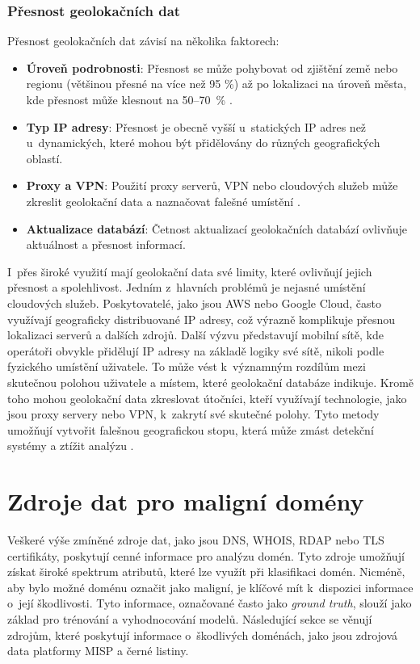 \subsubsection*{Přesnost geolokačních dat}
Přesnost geolokačních dat závisí na několika faktorech:
\begin{itemize}
    \item \textbf{Úroveň podrobnosti}: Přesnost se může pohybovat od zjištění země nebo regionu (většinou přesné na více než 95 \%) až po lokalizaci na úroveň města, kde přesnost může klesnout na 50--70~\% \cite{huang2017geolocation}.
    \item \textbf{Typ IP adresy}: Přesnost je obecně vyšší u~statických IP adres než u~dynamických, které mohou být přidělovány do různých geografických oblastí.
    \item \textbf{Proxy a VPN}: Použití proxy serverů, VPN nebo cloudových služeb může zkreslit geolokační data a naznačovat falešné umístění \cite{mcpherson2009vpn}.
    \item \textbf{Aktualizace databází}: Četnost aktualizací geolokačních databází ovlivňuje aktuálnost a přesnost informací.
\end{itemize}


I~přes široké využití mají geolokační data své limity, které ovlivňují jejich přesnost a spolehlivost. Jedním z~hlavních problémů je nejasné umístění cloudových služeb. Poskytovatelé, jako jsou AWS nebo Google Cloud, často využívají geograficky distribuované IP adresy, což výrazně komplikuje přesnou lokalizaci serverů a dalších zdrojů. Další výzvu představují mobilní sítě, kde operátoři obvykle přidělují IP adresy na základě logiky své sítě, nikoli podle fyzického umístění uživatele. To může vést k~významným rozdílům mezi skutečnou polohou uživatele a místem, které geolokační databáze indikuje. Kromě toho mohou geolokační data zkreslovat útočníci, kteří využívají technologie, jako jsou proxy servery nebo VPN, k~zakrytí své skutečné polohy. Tyto metody umožňují vytvořit falešnou geografickou stopu, která může zmást detekční systémy a ztížit analýzu \cite{mcpherson2009vpn}.





\section{Zdroje dat pro maligní domény}
Veškeré výše zmíněné zdroje dat, jako jsou DNS, WHOIS, RDAP nebo TLS certifikáty, poskytují cenné informace pro analýzu domén. Tyto zdroje umožňují získat široké spektrum atributů, které lze využít při klasifikaci domén. Nicméně, aby bylo možné doménu označit jako maligní, je klíčové mít k~dispozici informace o~její škodlivosti. Tyto informace, označované často jako \emph{ground truth}, slouží jako základ pro trénování a vyhodnocování modelů. Následující sekce se věnují zdrojům, které poskytují informace o~škodlivých doménách, jako jsou zdrojová data platformy MISP a černé listiny.

